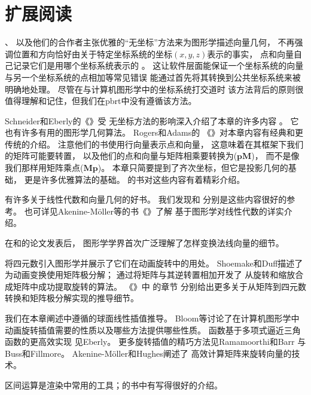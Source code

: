 \section{扩展阅读}\label{sec:扩展阅读02}
\citeauthor{10.1007/978-3-642-61542-9_19}、\citeauthor{10.1145/282957.282969}
以及他们的合作者主张优雅的“无坐标”方法来为图形学描述向量几何，
不再强调位置和方向恰好由关于特定坐标系统的坐标$(x,y,z)$表示的事实，
点和向量自己记录它们是用哪个坐标系统表示的
\citep{10.1145/282957.282969,10.1007/978-3-642-61542-9_19,Mann97acoordinate}。
这让软件层面能保证一个坐标系统的向量与另一个坐标系统的点相加等常见错误
能通过首先将其转换到公共坐标系统来被明确地处理。
尽管在与计算机图形学中的坐标系统打交道时
该方法背后的原则很值得理解和记住，但我们在pbrt中没有遵循该方法。

Schneider和Eberly的《》受
无坐标方法的影响深入介绍了本章的许多内容\citep{10.5555/2821579}
。
它也有许多有用的图形学几何算法。
Rogers和Adams\parencite*{10.5555/63448}的
《》对本章内容有经典和更传统的介绍。
注意他们的书使用行向量表示点和向量，
这意味着在其框架下我们的矩阵可能要转置，
以及他们的点和向量与矩阵相乘要转换为($\bm p\bm M$)，
而不是像我们那样用矩阵乘点($\bm M\bm p$)。
本章只简要提到了齐次坐标，但它是投影几何的基础，
更是许多优雅算法的基础。
\citeauthor{10.5555/113163}的书对这些内容有着精彩介绍\citep{10.5555/113163}。

有许多关于线性代数和向量几何的好书。
我们发现\citet{lang2012introduction}和\citet{buck1956advanced}
分别是这些内容很好的参考。
也可详见Akenine-Möller等的书《》\parencite*{10.5555/2829183}了解
基于图形学对线性代数的详实介绍。

在\citet{inproceedings}和\citet{TURKOWSKI1990539}的论文发表后，
图形学学界首次广泛理解了怎样变换法线向量的细节。

\citet{10.1145/325334.325242}将四元数引入图形学并展示了它们在动画旋转中的用处。
Shoemake和Duff\parencite*{10.5555/155294.155324}描述了为动画变换使用矩阵极分解；
\citet{doi:10.1137/0907079}通过将矩阵与其逆转置相加开发了
从旋转和缩放合成矩阵中成功提取旋转的算法。
《\emph{}》中
\citeauthor{SHOEMAKE1994207}的章节\parencite*{SHOEMAKE1991351,SHOEMAKE1994207,10.5555/180895.180914}
分别给出更多关于从矩阵到四元数转换和矩阵极分解实现的推导细节。

我们在本章阐述中遵循\citet{Blow_2004}的球面线性插值推导。
Bloom等\parencite*{Bloom2003ErrorsAO}讨论了在计算机图形学中
动画旋转插值需要的性质以及哪些方法提供哪些性质。
函数基于多项式逼近三角函数的更高效实现
见Eberly\parencite*{doi:10.1080/2151237X.2011.610255}。
更多旋转插值的精巧方法见Ramamoorthi和Barr\parencite*{10.1145/258734.258870}
与Buss和Fillmore\parencite*{10.1145/502122.502124}。
Akenine-Möller和Hughes\parencite*{doi:10.1080/10867651.1999.10487509}阐述了
高效计算矩阵来旋转向量的技术。

区间运算是渲染中常用的工具；\citet{moore1966interval}的书中有写得很好的介绍。